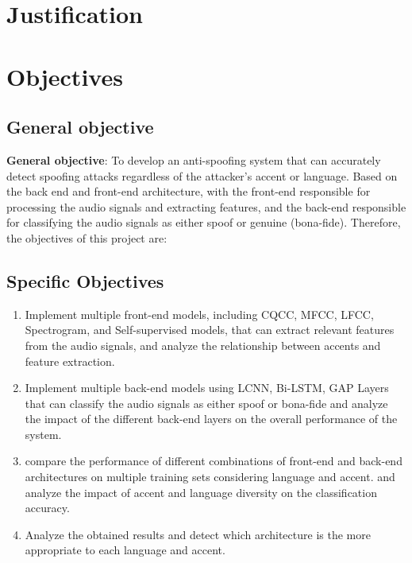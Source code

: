 
\section{Justification}



\section{Objectives}

\subsection{General objective}

\textbf{General objective}: To develop an anti-spoofing system that can accurately detect spoofing attacks regardless of the attacker's accent or language. Based on the back end and front-end architecture, with the front-end responsible for processing the audio signals and extracting features, and the back-end responsible for classifying the audio signals as either spoof or genuine (bona-fide). Therefore, the objectives of this project are:

\subsection{Specific Objectives}

\begin{enumerate}
    \item Implement multiple front-end models, including \acs{CQCC}, \acs{MFCC}, \acs{LFCC}, Spectrogram, and Self-supervised models, that can extract relevant features from the audio signals, and analyze the relationship between accents and feature extraction.
    \item Implement multiple back-end models using \acs{LCNN}, \acs{Bi-LSTM}, \acs{GAP} Layers that can classify the audio signals as either spoof or bona-fide and analyze the impact of the different back-end layers on the overall performance of the system.
    \item compare the performance of different combinations of front-end and back-end architectures on multiple training sets considering language and accent. and analyze the impact of accent and language diversity on the classification accuracy.
    \item Analyze the obtained results and detect which architecture is the more appropriate to each language and accent.
\end{enumerate}




\endinput

